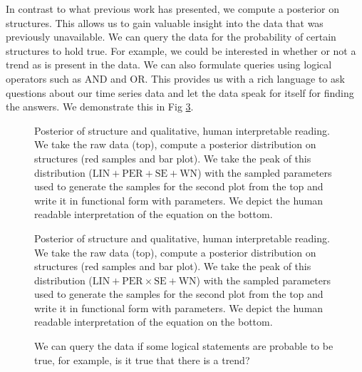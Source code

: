 In contrast to what previous work has presented, we compute a posterior on structures. This allows us to gain valuable insight into the data that was previously unavailable. 
We can query the data for the probability of certain structures to hold true. For example, we could be interested in whether or not a trend as is present in the data.
We can also formulate queries using logical operators such as AND and OR. This provides us with a rich language to ask questions about our time series data and let the data speak for itself for finding the answers. We demonstrate this in Fig \ref{fig:query}.

\begin{figure}
\centering

\caption{\small Posterior of structure and qualitative, human interpretable reading. We take the raw data (top), compute a posterior distribution on structures (red samples and bar plot).
We take the peak of this distribution ($\text{LIN}+\text{PER}+\text{SE}+\text{WN}$) with the sampled parameters used to generate the samples for the second plot from the top and write it in functional form with parameters. We depict the human readable interpretation of the equation on the bottom.}\label{fig:posterior}
\end{figure}

\begin{figure}
\centering

\caption{\small Posterior of structure and qualitative, human interpretable reading. We take the raw data (top), compute a posterior distribution on structures (red samples and bar plot).
We take the peak of this distribution ($\text{LIN}+\text{PER} \times \text{SE}+\text{WN}$) with the sampled parameters used to generate the samples for the second plot from the top and write it in functional form with parameters. We depict the human readable interpretation of the equation on the bottom.}\label{fig:posterior_airline}
\end{figure}

\begin{figure}
\centering

\caption{We can query the data if some logical statements are probable to be true, for example, is it true that there is a trend?}\label{fig:query}
\end{figure}
